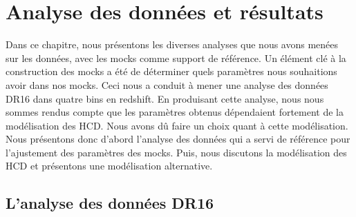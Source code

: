 
% 

% 


\graphicspath{ {../figures/data_ana/} }

\chapter{Analyse des données et résultats}
\label{chap:data_ana}
\minitoc
\newpage
\thispagestyle{fancy}

Dans ce chapitre, nous présentons les diverses analyses que nous avons menées sur les données, avec les mocks comme support de référence.
Un élément clé à la construction des mocks a été de déterminer quels paramètres \lya{} nous souhaitions avoir dans nos mocks.
Ceci nous a conduit à mener une analyse des données DR16 dans quatre bins en redshift.
En produisant cette analyse, nous nous sommes rendus compte que les paramètres \lya{} obtenus dépendaient fortement de la modélisation des HCD. Nous avons dû faire un choix quant à cette modélisation.
Nous présentons donc d'abord l'analyse des données qui a servi de référence pour l'ajustement des paramètres des mocks. Puis, nous discutons la modélisation des HCD et présentons une modélisation alternative.



\section{L'analyse des données DR16}
